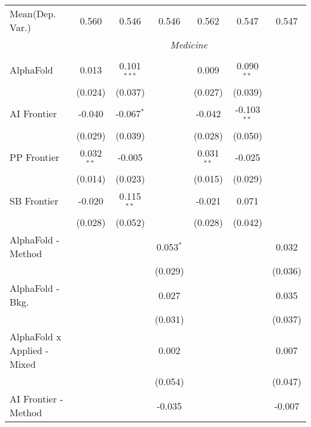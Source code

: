 \begin{tabular}{lcccccc}
Mean(Dep. Var.) & 0.560 & 0.546 & 0.546 & 0.562 & 0.547 & 0.547 \\
 & \multicolumn{6}{c}{\textit{Medicine}} \\ \\
   AlphaFold                   & 0.013        & 0.101$^{***}$ &             & 0.009        & 0.090$^{**}$  &   \\   
                               & (0.024)      & (0.037)       &             & (0.027)      & (0.039)       &   \\   
   AI Frontier                 & -0.040       & -0.067$^{*}$  &             & -0.042       & -0.103$^{**}$ &   \\   
                               & (0.029)      & (0.039)       &             & (0.028)      & (0.050)       &   \\   
   PP Frontier                 & 0.032$^{**}$ & -0.005        &             & 0.031$^{**}$ & -0.025        &   \\   
                               & (0.014)      & (0.023)       &             & (0.015)      & (0.029)       &   \\   
   SB Frontier                 & -0.020       & 0.115$^{**}$  &             & -0.021       & 0.071         &   \\   
                               & (0.028)      & (0.052)       &             & (0.028)      & (0.042)       &   \\   
   AlphaFold - Method          &              &               & 0.053$^{*}$ &              &               & 0.032\\   
                               &              &               & (0.029)     &              &               & (0.036)\\   
   AlphaFold - Bkg.            &              &               & 0.027       &              &               & 0.035\\   
                               &              &               & (0.031)     &              &               & (0.037)\\   
   AlphaFold x Applied - Mixed &              &               & 0.002       &              &               & 0.007\\   
                               &              &               & (0.054)     &              &               & (0.047)\\   
   AI Frontier - Method        &              &               & -0.035      &              &               & -0.007\\   

\end{tabular}
